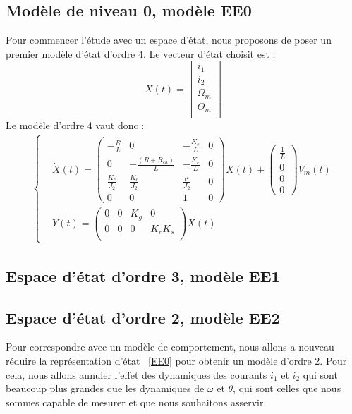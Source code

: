 \subsection{Modèle de niveau 0, modèle EE0}
Pour commencer l'étude avec un espace d'état, nous proposons de poser un premier modèle d'état d'ordre 4. Le vecteur d'état choisit est :
\begin{equation}
X(t)=\begin{bmatrix}
i_1\\
i_2\\
\Omega_m\\
\Theta_m\\
\end{bmatrix}
\end{equation} 
Le modèle d'ordre 4 vaut donc :
\begin{align}
\label{EE0}
\left\lbrace
\begin{aligned}
&\dot{X}(t) = \begin{pmatrix}
-\frac{R}{L}	& 	    0				&   -\frac{K_e}{L}	& 0\\
      0			&  -\frac{(R+R_{ch})}{L}	&	-\frac{K_e}{L}	& 0\\
\frac{K_c}{J_2}	&	\frac{K_c}{J_2}		&	\frac{\mu}{J_2}	&	0\\
0&	0&	1&	0
\end{pmatrix}X(t)+\begin{pmatrix}
\frac{1}{L}\\0\\0\\0
\end{pmatrix}V_m(t)\\
&Y(t) = \begin{pmatrix}
0&	0&	K_g	&	0\\
0&	0&	0	&	K_rK_s\\
\end{pmatrix}X(t)
\end{aligned}
\right.
\end{align}
\subsection{Espace d'état d'ordre 3, modèle EE1}
\subsection{Espace d'état d'ordre 2, modèle EE2}
Pour correspondre avec un modèle de comportement, nous allons a nouveau réduire la représentation d'état ~\eqref{EE0} pour obtenir un modèle d'ordre 2. Pour cela, nous allons annuler l'effet des dynamiques des courants $i_1$ et $i_2$ qui sont beaucoup plus grandes que les dynamiques de $\omega$ et $\theta$, qui sont celles que nous sommes capable de mesurer et que nous souhaitons asservir.\\

